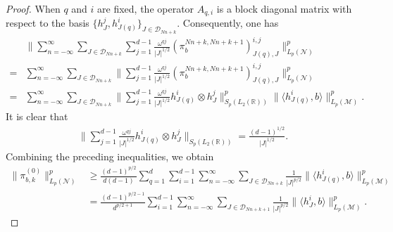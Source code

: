 \documentclass[oneside,english,a4wide]{amsart}
\numberwithin{equation}{section}
\numberwithin{figure}{section}
\theoremstyle{plain}
\theoremstyle{plain}
\theoremstyle{definition}
\theoremstyle{plain}
\theoremstyle{remark}
\theoremstyle{definition}
\theoremstyle{remark}
\theoremstyle{definition}
\newcommand{\8}{\infty}
\begin{document}
\begin{proof}
	When $q$ and $i$ are fixed, the operator $A_{q, i}$ is a block diagonal matrix with respect to the basis $\{h_J^j,h_{J(q)}^i\}_{J\in\mathcal{D}_{Nn+k}}$. Consequently, one has
	\begin{equation*}\label{3.4.2}
		\begin{aligned}
			{}&\biggl\|\sum_{n=-\infty}^{\infty}\sum_{J\in \mathcal{D}_{Nn+k}}\sum_{j=1}^{d-1}\frac{\omega^{qj}}{|J|^{1/2}}(\pi_b^{Nn+k,Nn+k+1})_{J(q),J}^{i,j}\biggr\|^p_{L_p(\mathcal{N})}\\= &\sum_{n=-\infty}^{\infty}\sum_{J\in \mathcal{D}_{Nn+k}}\biggl\|\sum_{j=1}^{d-1}\frac{\omega^{qj}}{|J|^{1/2}}(\pi_b^{Nn+k,Nn+k+1})_{J(q),J}^{i,j}\biggr\|^p_{L_p(\mathcal{N})}\\=&\sum_{n=-\infty}^{\infty}\sum_{J\in \mathcal{D}_{Nn+k}}\biggl\|\sum_{j=1}^{d-1}\frac{\omega^{qj}}{|J|^{1/2}}h_{J(q)}^i\otimes h_J^j\biggr\|_{S_p(L_2(\mathbb{R}))}^p\|\langle h_{J(q)}^i,b\rangle\|_{L_p(\mathcal{M})}^p.
		\end{aligned}
	\end{equation*}
	It is clear that 
	\begin{equation*}\label{3.4.3}
		\begin{aligned}
			\biggl\|\sum_{j=1}^{d-1}\frac{\omega^{qj}}{|J|^{1/2}}h_{J(q)}^i\otimes h_J^j\biggr\|_{S_p(L_2(\mathbb{R}))}=\frac{(d-1)^{1/2}}{|J|^{1/2}}.
		\end{aligned}
	\end{equation*}
	Combining the preceding inequalities, we obtain
	\begin{equation*}
		\begin{aligned}
			\|\pi^{(0)}_{b,k}\|^p_{{L_p(\mathcal{N})}}{}&\ge \frac{(d-1)^{p/2}}{d(d-1)}\sum_{q=1}^d\sum_{i=1}^{d-1}\sum_{n=-\infty}^{\infty}\sum_{J\in \mathcal{D}_{Nn+k}}\frac{1}{|J|^{p/2}}\|\langle h_{J(q)}^i,b\rangle\|_{L_p(\mathcal{M})}^p\\&= \frac{(d-1)^{p/2-1}}{d^{p/2+1}}\sum_{i=1}^{d-1}\sum_{n=-\infty}^{\infty}\sum_{J\in \mathcal{D}_{Nn+k+1}}\frac{1}{|J|^{p/2}}\|\langle h_{J}^i,b\rangle\|_{L_p(\mathcal{M})}^p.

\end{aligned}
\end{equation*}
\end{proof}
\end{document}
